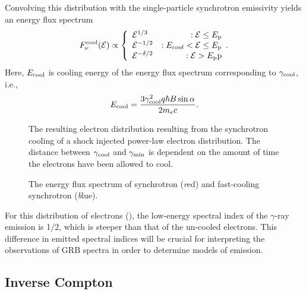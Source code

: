 Convolving this distribution with the single-particle synchrotron
emissivity yields an energy flux spectrum
\begin{equation}
  \label{eq:coolSynch}
   F_{\nu}^{\rm cool}(\mathcal{E})\propto\left\{
     \begin{array}{lr}
       \mathcal{E}^{1/3} & : \mathcal{E}\leq E_{\rm p}\\
       \mathcal{E}^{-1/2} & : E_{cool}<\mathcal{E}\leq E_{\rm p}\\
       \mathcal{E}^{-\delta/2} & : \mathcal{E}>E_{\rm p}{\rm p}
     \end{array}.
   \right.
\end{equation}
Here, $E_{\rm cool}$ is cooling energy of the energy flux spectrum corresponding to $\gamma_{\rm cool}$, i.e., 
\begin{equation}
  \label{eq:Ec}
  E_{\rm cool}= \frac{3 \gamma_{\rm cool}^2 q \hbar B \sin{\alpha}}{2 m_e c}.
\end{equation}

\begin{figure}[t]

  \centering
  \caption{The resulting
    electron distribution resulting from the synchrotron cooling of a
    shock injected power-law electron distribution. The distance
    between $\gamma_{\rm cool}$ and $\gamma_{\rm min}$ is dependent on
    the amount of time the electrons have been allowed to cool.}
\label{fig:fastE}
\end{figure}

\begin{figure}[ht]
  \centering
  \caption{The energy flux spectrum of synchrotron  ({\emph red}) and fast-cooling synchrotron ({\emph blue}).}
\end{figure}

For this distribution of electrons (), the
low-energy spectral index of the $\gamma$-ray emission is 1/2, which
is steeper than that of the un-cooled electrons. This difference in
emitted spectral indices will be crucial for interpreting the
observations of GRB spectra in order to determine models of emission.





\subsection{Inverse Compton}

